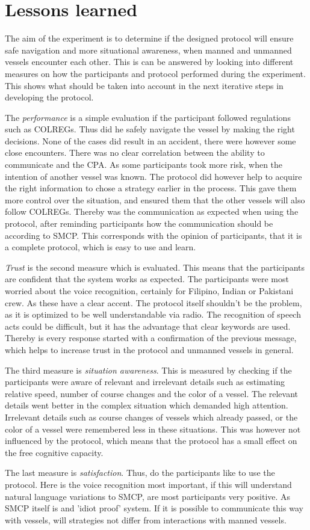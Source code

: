 \section{Lessons learned}
The aim of the experiment is to determine if the designed protocol will ensure safe navigation and more situational awareness, when manned and unmanned vessels encounter each other. This is can be answered by looking into different measures on how the participants and protocol performed during the experiment. This shows what should be taken into account in the next iterative steps in developing the protocol.

The \emph{performance} is a simple evaluation if the participant followed regulations such as \ac{COLREGs}. Thus did he safely navigate the vessel by making the right decisions. None of the cases did result in an accident, there were however some close encounters. There was no clear correlation between the ability to communicate and the \acf{CPA}. As some participants took more risk, when the intention of another vessel was known. The protocol did however help to acquire the right information to chose a strategy earlier in the process. This gave them more control over the situation, and ensured them that the other vessels will also follow \ac{COLREGs}.
Thereby was the communication as expected when using the protocol, after reminding participants how the communication should be according to \ac{SMCP}. This corresponds with the opinion of participants, that it is a complete protocol, which is easy to use and learn.

\emph{Trust} is the second measure which is evaluated. This means that the participants are confident that the system works as expected. The participants were most worried about the voice recognition, certainly for Filipino, Indian or Pakistani crew. As these have a clear accent. The protocol itself shouldn't be the problem, as it is optimized to be well understandable via radio. The recognition of speech acts could be difficult, but it has the advantage that clear keywords are used. Thereby is every response started with a confirmation of the previous message, which helps to increase trust in the protocol and unmanned vessels in general.

The third measure is \emph{situation awareness}. This is measured by checking if the participants were aware of relevant and irrelevant details such as estimating relative speed, number of course changes and the color of a vessel. The relevant details went better in the complex situation which demanded high attention. Irrelevant details such as course changes of vessels which already passed, or the color of a vessel were remembered less in these situations. This was however not influenced by the protocol, which means that the protocol has a small effect on the free cognitive capacity.

The last measure is \emph{satisfaction}. Thus, do the participants like to use the protocol. Here is the voice recognition most important, if this will understand natural language variations to \ac{SMCP}, are most participants very positive. As \ac{SMCP} itself is and 'idiot proof' system. If it is possible to communicate this way with vessels, will strategies not differ from interactions with manned vessels.